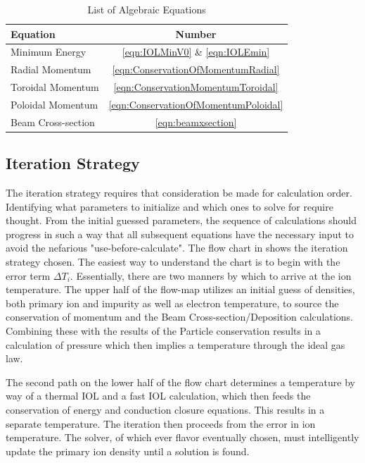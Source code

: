 \begin{table}
	\centering
	\caption{List of Algebraic Equations}
	\begin{tabular}{|l|c|}
		\hline
		Equation & Number \\
		\hline
		Minimum Energy & \ref{eqn:IOLMinV0} \& \ref{eqn:IOLEmin} \\
		\hline
		Radial Momentum & \ref{eqn:ConservationOfMomentumRadial} \\
		\hline
		Toroidal Momentum & \ref{eqn:ConservationMomentumToroidal} \\
		\hline
		Poloidal Momentum & \ref{eqn:ConservationOfMomentumPoloidal} \\
		\hline
		Beam Cross-section & \ref{eqn:beamxsection} \\
		\hline
	\end{tabular}
	\label{tab:AlgebraicCategorization}
\end{table}

\subsection{Iteration Strategy} \label{sub:CalculationOrder}

The iteration strategy requires that consideration be made for calculation order. Identifying what parameters to initialize and which ones to solve for require thought. From the initial guessed parameters, the sequence of calculations should progress in such a way that all subsequent equations have the necessary input to avoid the nefarious "use-before-calculate". The flow chart in  shows the iteration strategy chosen. The easiest way to understand the chart is to begin with the error term $\Delta T_i$. Essentially, there are two manners by which to arrive at the ion temperature. The upper half of the flow-map utilizes an initial guess of densities, both primary ion and impurity as well as electron temperature, to source the conservation of momentum and the Beam Cross-section/Deposition calculations. Combining these with the results of the Particle conservation results in a calculation of pressure which then implies a temperature through the ideal gas law.

The second path on the lower half of the flow chart determines a temperature by way of a thermal \ac{IOL} and a fast \ac{IOL} calculation, which then feeds the conservation of energy and conduction closure equations. This results in a separate temperature. The iteration then proceeds from the error in ion temperature. The solver, of which ever flavor eventually chosen, must intelligently update the primary ion density until a solution is found.

